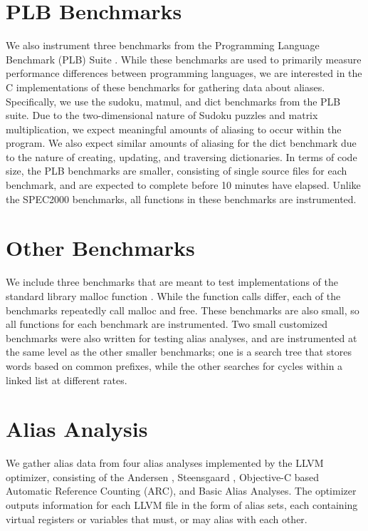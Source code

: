 \section{PLB Benchmarks}
We also instrument three benchmarks from the Programming Language Benchmark (PLB) Suite \cite{plb}. While these benchmarks are used to primarily measure performance differences between programming languages, we are interested in the C implementations of these benchmarks for gathering data about aliases. Specifically, we use the sudoku, matmul, and dict benchmarks from the PLB suite. Due to the two-dimensional nature of Sudoku puzzles and matrix multiplication, we expect meaningful amounts of aliasing to occur within the program. We also expect similar amounts of aliasing for the dict benchmark due to the nature of creating, updating, and traversing dictionaries. In terms of code size, the PLB benchmarks are smaller, consisting of single source files for each benchmark, and are expected to complete before 10 minutes have elapsed. Unlike the SPEC2000 benchmarks, all functions in these benchmarks are instrumented.

\section{Other Benchmarks}
We include three benchmarks that are meant to test implementations of the standard library malloc function \cite{malloc}. While the function calls differ, each of the benchmarks repeatedly call malloc and free. These benchmarks are also small, so all functions for each benchmark are instrumented. Two small customized benchmarks were also written for testing alias analyses, and are instrumented at the same level as the other smaller benchmarks; one is a search tree that stores words based on common prefixes, while the other searches for cycles within a linked list at different rates. 

\section{Alias Analysis}
We gather alias data from four alias analyses implemented by the LLVM optimizer, consisting of the Andersen \cite{Andersen}, Steensgaard \cite{Steensgaard}, Objective-C based Automatic Reference Counting (ARC), and Basic \cite{llvmaa} Alias Analyses. The optimizer outputs information for each LLVM file in the form of alias sets, each containing virtual registers or variables that must, or may alias with each other.
